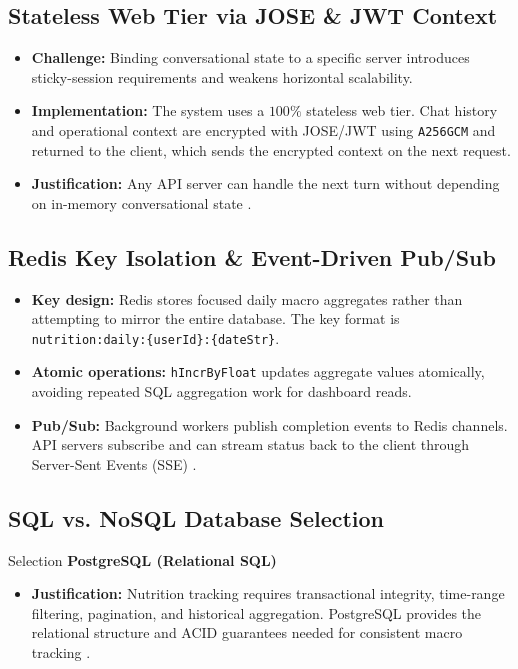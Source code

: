 \documentclass[11pt,a4paper,twoside]{article}
\begin{document}
\subsection{Stateless Web Tier via JOSE \& JWT Context}
\begin{itemize}
  \item \textbf{Challenge:} Binding conversational state to a specific server introduces sticky-session requirements and weakens horizontal scalability.
  \item \textbf{Implementation:} The system uses a $100\%$ stateless web tier. Chat history and operational context are encrypted with JOSE/JWT using \texttt{A256GCM} and returned to the client, which sends the encrypted context on the next request.
  \item \textbf{Justification:} Any API server can handle the next turn without depending on in-memory conversational state \cite{xu2020system}.
\end{itemize}

\subsection{Redis Key Isolation \& Event-Driven Pub/Sub}
\begin{itemize}
  \item \textbf{Key design:} Redis stores focused daily macro aggregates rather than attempting to mirror the entire database. The key format is \texttt{nutrition:daily:\{userId\}:\{dateStr\}}.
  \item \textbf{Atomic operations:} \texttt{hIncrByFloat} updates aggregate values atomically, avoiding repeated SQL aggregation work for dashboard reads.
  \item \textbf{Pub/Sub:} Background workers publish completion events to Redis channels. API servers subscribe and can stream status back to the client through Server-Sent Events (SSE) \cite{xu2020system}.
\end{itemize}

\subsection{SQL vs. NoSQL Database Selection}
\begin{designbox}{Selection}
\textbf{PostgreSQL (Relational SQL)}
\end{designbox}
\begin{itemize}
  \item \textbf{Justification:} Nutrition tracking requires transactional integrity, time-range filtering, pagination, and historical aggregation. PostgreSQL provides the relational structure and ACID guarantees needed for consistent macro tracking \cite{xu2020system}.
\end{itemize}
\end{document}
